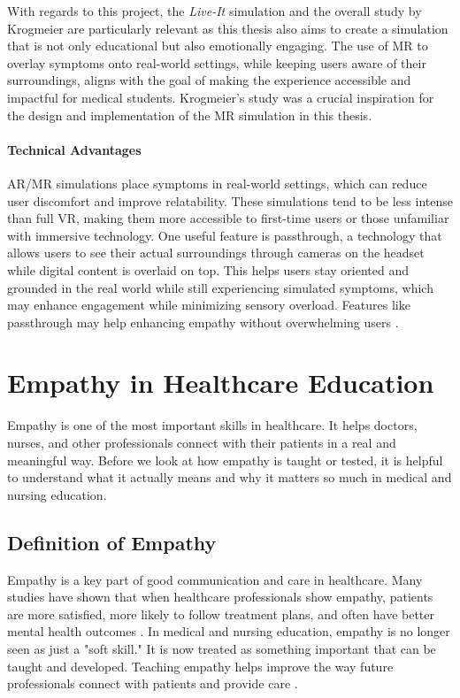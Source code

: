 With regards to this project, the \textit{Live-It} simulation and the overall study by Krogmeier \cite{Krogmeier2024} are particularly relevant as this thesis also aims to create a simulation that is not only educational but also emotionally engaging. The use of MR to overlay symptoms onto real-world settings, while keeping users aware of their surroundings, aligns with the goal of making the experience accessible and impactful for medical students. Krogmeier's study was a crucial inspiration for the design and implementation of the MR simulation in this thesis.

\paragraph{Technical Advantages}

AR/MR simulations place symptoms in real-world settings, which can reduce user discomfort and improve relatability. These simulations tend to be less intense than full VR, making them more accessible to first-time users or those unfamiliar with immersive technology. One useful feature is passthrough, a technology that allows users to see their actual surroundings through cameras on the headset while digital content is overlaid on top. This helps users stay oriented and grounded in the real world while still experiencing simulated symptoms, which may enhance engagement while minimizing sensory overload. Features like passthrough may help enhancing empathy without overwhelming users \cite{Krogmeier2024, Silva2017, Lan2023}.

\section{Empathy in Healthcare Education}

Empathy is one of the most important skills in healthcare. It helps doctors, nurses, and other professionals connect with their patients in a real and meaningful way. Before we look at how empathy is taught or tested, it is helpful to understand what it actually means and why it matters so much in medical and nursing education.

\subsection{Definition of Empathy}
Empathy is a key part of good communication and care in healthcare. Many studies have shown that when healthcare professionals show empathy, patients are more satisfied, more likely to follow treatment plans, and often have better mental health outcomes \cite{Cunico2012, Olson1995, Ozcan2018}. In medical and nursing education, empathy is no longer seen as just a "soft skill." It is now treated as something important that can be taught and developed. Teaching empathy helps improve the way future professionals connect with patients and provide care \cite{Cunico2012}.

